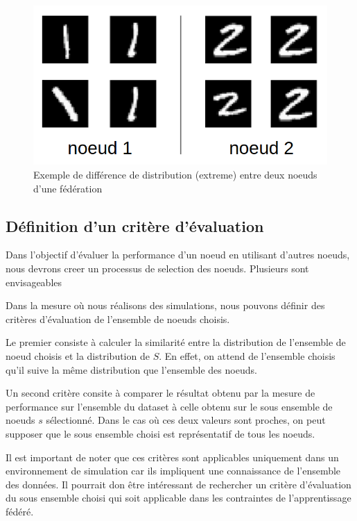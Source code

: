 \documentclass[stage3a]{tnreport} %
\begin{document}
\begin{figure}[]
  \centering
  \includegraphics[scale=1.8]{figures/node_divergence.png}
  \caption{Exemple de différence de distribution (extreme) entre deux noeuds d'une fédération}
  \label{fig:imbalence}
\end{figure}

\subsection{Définition d'un critère d'évaluation}

Dans l'objectif d'évaluer la performance d'un noeud en utilisant d'autres noeuds, nous devrons creer un processus de selection des noeuds. Plusieurs sont envisageables

Dans la mesure où nous réalisons des simulations, nous pouvons définir des critères d'évaluation de l'ensemble de noeuds choisis.

Le premier consiste à calculer la similarité entre la distribution de l'ensemble de noeud choisis et la distribution de $S$. En effet, on attend de l'ensemble choisis qu'il suive la même distribution que l'ensemble des noeuds. 

Un second critère consite à comparer le résultat obtenu par la mesure de performance sur l'ensemble du dataset à celle obtenu sur le sous ensemble de noeuds $s$ sélectionné. Dans le cas où ces deux valeurs sont proches, on peut supposer que le sous ensemble choisi est représentatif de tous les noeuds.


Il est important de noter que ces critères sont applicables uniquement dans un environnement de simulation car ils impliquent une connaissance de l'ensemble des données. Il pourrait don être intéressant de rechercher un critère d'évaluation du sous ensemble choisi qui soit applicable dans les contraintes de l'apprentissage fédéré.
\end{document}

